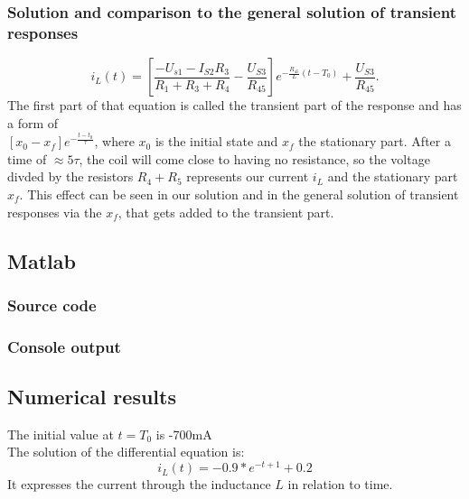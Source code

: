 \documentclass[a4paper]{article}
\begin{document}
\subsubsection{Solution and comparison to the general solution of transient responses}
\[
   i_{L}(t) = \left[ \frac{-U_{s1} - I_{S2}R_3}{R_1+R_3+R_4} - \frac{U_{S3}}{R_{45}}
 \right] e^{-\frac{R_{45}}{L} (t-T_0)} + \frac{U_{S3}}{R_{45}}
.\] 
The first part of that equation is called the transient part of the response and has a form of \\
$\left[x_0 - x_f\right] e^{-\frac{t-t_0}{\tau}}$, where $x_0$ is the initial state and $x_f$ the
stationary part. After a time of $\approx5\tau$, the coil will come close to having no resistance, so the
voltage divded by the resistors $R_4+R_5$ represents our current $i_{L}$ and the stationary part
$x_f$. This effect can be seen in our solution and in the general solution of transient responses
via the $x_f$, that gets added to the transient part.   



\clearpage
\subsection{Matlab}
\subsubsection{Source code}

\subsubsection{Console output}
  
\vspace{2mm}

\subsection{Numerical results}
The initial value at $t = T_0$ is -700mA\\
The solution of the differential equation is:
\begin{equation*}
   i_L(t) = -0.9 * e^{-t + 1} + 0.2
\end{equation*}
It expresses the current through the inductance $L$ in relation to time.
\clearpage
\end{document}
